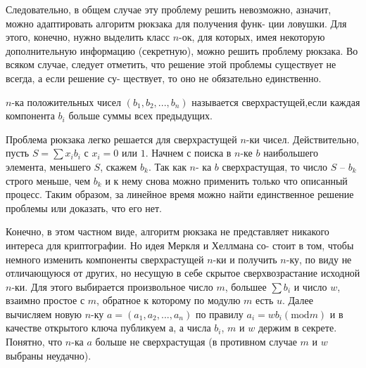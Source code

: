 Следовательно, в общем случае эту проблему решить невозможно, а\linebreak значит, можно адаптировать алгоритм рюкзака для получения функ-\linebreak
­ции ловушки. Для этого, конечно, нужно выделить класс $n$-ок, для\linebreak
которых, имея некоторую дополнительную информацию (секретную),\linebreak
можно решить проблему рюкзака. Во всяком случае, следует отметить,\linebreak
что решение этой проблемы существует не всегда, а если решение су-\linebreak
ществует, то оно не обязательно единственно.
\begin{determ}
$n$-ка положительных чисел $(b_1,b_2,...,b_n)$ называется сверхрастущей,\linebreak если каждая компонента $b_i$ больше суммы всех предыдущих.
\end{determ}
Проблема рюкзака легко решается для сверхрастущей $n$-ки чисел.\linebreak
Действительно, пусть $S = \sum x_i b_i$ с $x_i = 0$ или $1$. Начнем с поиска\linebreak
\noindent в $n$-ке $b$ наибольшего элемента, меньшего $S$, скажем $b_k$. Так как $n$-\linebreak
ка $b$ сверхрастущая, то число $S\text{ -- }b_k$ строго меньше, чем $b_k$ и к нему\linebreak
снова можно применить только что описанный процесс. Таким образом,\linebreak
за линейное время можно найти единственное решение проблемы или\linebreak
доказать, что его нет.

Конечно, в этом частном виде, алгоритм рюкзака не представляет\linebreak
никакого интереса для криптографии. Но идея Меркля и Хеллмана со­-\linebreak
стоит в том, чтобы немного изменить компоненты сверхрастущей $n$-ки\linebreak
и получить $n$-ку, по виду не отличающуюся от других, но несущую в\linebreak
себе скрытое сверхвозрастание исходной $n$-ки. Для этого выбирается\linebreak
произвольное число $m$, большее $\sum b_i$ и число $w$, взаимно простое с $m$,\linebreak
обратное к которому по модулю $m$ есть $u$. Далее вычисляем новую $n$-ку\linebreak
$a = (a_1,a_2,...,a_n)$ по правилу $a_i = wb_i (\text{mod} m)$ и в качестве открытого\linebreak
ключа публикуем $а$, а числа $b_i$, $m$ и $w$ держим в секрете. Понятно, что\linebreak
$n$-ка $a$ больше не сверхрастущая (в противном случае $m$ и $w$ выбраны\linebreak
неудачно).

